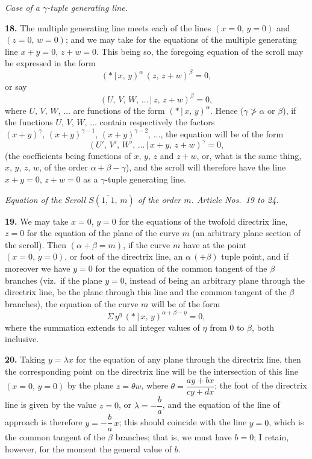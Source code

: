 \documentclass[11pt,a4paper]{article}
\providecommand{\mid}{\,|\,}
\begin{document}
\medskip

\begin{center}
\textit{Case of a $\gamma$-tuple generating line.}
\end{center}

\textbf{18.} The multiple generating line meets each of the lines $(x = 0,\,y = 0)$ and $(z = 0,\,w = 0)$; and we may take for the equations of the multiple generating line $x + y = 0$, $z + w = 0$. This being so, the foregoing equation of the scroll may be expressed in the form
\[
(*\mid x,\,y)^{\alpha}\,(z,\,z + w)^{\beta} = 0,
\]
or say
\[
(U,\,V,\,W,\,\ldots\mid z,\,z + w)^{\beta} = 0,
\]
where $U,\,V,\,W,\,\ldots$ are functions of the form $(*\mid x,\,y)^{\alpha}$. Hence ($\gamma \not> \alpha$ or $\beta$), if the functions $U,\,V,\,W,\,\ldots$ contain respectively the factors $(x + y)^{\gamma},\,(x + y)^{\gamma - 1},\,(x + y)^{\gamma - 2},\,\ldots$, the equation will be of the form
\[
(U',\,V',\,W',\,\ldots\mid x + y,\,z + w)^{\gamma} = 0,
\]
(the coefficients being functions of $x,\,y,\,z$ and $z + w$, or, what is the same thing, $x,\,y,\,z,\,w$, of the order $\alpha + \beta - \gamma$), and the scroll will therefore have the line $x + y = 0$, $z + w = 0$ as a $\gamma$-tuple generating line.

\bigskip

\begin{center}
\textit{Equation of the Scroll $S(\overline{1,\,1},\,m)$ of the order $m$. Article Nos.\ 19 to 24.}
\end{center}

\textbf{19.} We may take $x = 0$, $y = 0$ for the equations of the twofold directrix line, $z = 0$ for the equation of the plane of the curve $m$ (an arbitrary plane section of the scroll). Then $(\alpha + \beta = m)$, if the curve $m$ have at the point $(x = 0,\,y = 0)$, or foot of the directrix line, an $\alpha\,(+\beta)$ tuple point, and if moreover we have $y = 0$ for the equation of the common tangent of the $\beta$ branches (viz.\ if the plane $y = 0$, instead of being an arbitrary plane through the directrix line, be the plane through this line and the common tangent of the $\beta$ branches), the equation of the curve $m$ will be of the form
\[
\Sigma\,y^{\eta}\,(*\mid x,\,y)^{\alpha + \beta - \eta} = 0,
\]
where the summation extends to all integer values of $\eta$ from $0$ to $\beta$, both inclusive.

\medskip

\textbf{20.} Taking $y = \lambda x$ for the equation of any plane through the directrix line, then the corresponding point on the directrix line will be the intersection of this line $(x = 0,\,y = 0)$ by the plane $z = \theta w$, where $\theta = \dfrac{ay + bx}{cy + dx}$; the foot of the directrix line is given by the value $z = 0$, or $\lambda = -\dfrac{b}{a}$, and the equation of the line of approach is therefore $y = -\dfrac{b}{a}\,x$; this should coincide with the line $y = 0$, which is the common tangent of the $\beta$ branches; that is, we must have $b = 0$; I retain, however, for the moment the general value of $b$.
\end{document}
